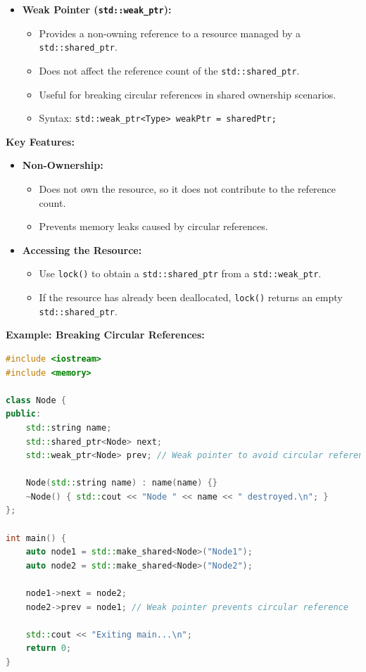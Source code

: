 \documentclass{report}
\begin{document}
\begin{itemize}
	\item \textbf{Weak Pointer (\texttt{std::weak\_ptr}):}
	\begin{itemize}
		\item Provides a non-owning reference to a resource managed by a \texttt{std::shared\_ptr}.
		\item Does not affect the reference count of the \texttt{std::shared\_ptr}.
		\item Useful for breaking circular references in shared ownership scenarios.
		\item Syntax: \texttt{std::weak\_ptr<Type> weakPtr = sharedPtr;}
	\end{itemize}
\end{itemize}


\textbf{Key Features:}
\begin{itemize}
	\item \textbf{Non-Ownership:}
		  \begin{itemize}
			  \item Does not own the resource, so it does not contribute to the reference count.
			  \item Prevents memory leaks caused by circular references.
		  \end{itemize}
	\item \textbf{Accessing the Resource:}
		  \begin{itemize}
			  \item Use \texttt{lock()} to obtain a \texttt{std::shared\_ptr} from a \texttt{std::weak\_ptr}.
			  \item If the resource has already been deallocated, \texttt{lock()} returns an empty \texttt{std::shared\_ptr}.
		  \end{itemize}
\end{itemize}

\textbf{Example: Breaking Circular References:}
\begin{lstlisting}[language=C++]
#include <iostream>
#include <memory>

class Node {
public:
	std::string name;
	std::shared_ptr<Node> next;
	std::weak_ptr<Node> prev; // Weak pointer to avoid circular reference

	Node(std::string name) : name(name) {}
	~Node() { std::cout << "Node " << name << " destroyed.\n"; }
};

int main() {
	auto node1 = std::make_shared<Node>("Node1");
	auto node2 = std::make_shared<Node>("Node2");

	node1->next = node2;
	node2->prev = node1; // Weak pointer prevents circular reference

	std::cout << "Exiting main...\n";
	return 0;
}
\end{lstlisting}
\end{document}
